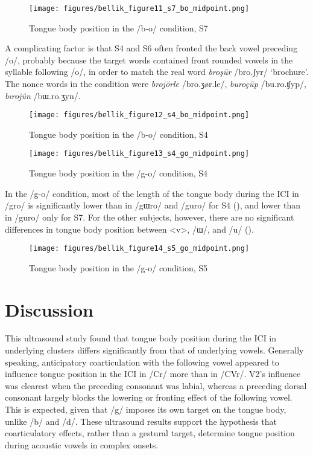 \documentclass[output=paper,colorlinks,citecolor=brown]{langscibook}
\begin{document}
\begin{figure}
\caption{Tongue body position in the /b-o/ condition, S7}
\texttt{[image: figures/bellik\_figure11\_s7\_bo\_midpoint.png]}
\label{bos7}
\end{figure}

A complicating factor is that S4 and S6 often fronted the back vowel preceding /o/, probably because the target words contained front rounded vowels in the syllable following /o/, in order to match the real word \textit{broşür} /bro.ʃyr/ ‘brochure’. The nonce words in the condition were \textit{brojörle} /bro.ʒør.le/, \textit{buroçüp} /bu.ro.ʧyp/, \textit{bırojün} /bɯ.ro.ʒyn/.

\begin{figure}
\caption{Tongue body position in the /b-o/ condition, S4}
\texttt{[image: figures/bellik\_figure12\_s4\_bo\_midpoint.png]}
\label{bos4}
\end{figure}

\begin{figure}
\caption{Tongue body position in the /g-o/ condition, S4}
\texttt{[image: figures/bellik\_figure13\_s4\_go\_midpoint.png]}
\label{gos4}
\end{figure}


In the /g-o/ condition, most of the length of the tongue body during the ICI in /gro/ is significantly lower than in /gɯro/ and /guro/ for S4 (), and lower than in /guro/ only for S7. For the other subjects, however, there are no significant differences in tongue body position between <v>, /ɯ/, and /u/ ().

\begin{figure}
\caption{Tongue body position in the /g-o/ condition, S5}
\texttt{[image: figures/bellik\_figure14\_s5\_go\_midpoint.png]}
\label{gos5}
\end{figure}


\section{Discussion}
This ultrasound study found that tongue body position during the ICI in underlying clusters differs significantly from that of underlying vowels. Generally speaking, anticipatory coarticulation with the following vowel appeared to influence tongue position in the ICI in /Cr/ more than in /CVr/. V2's influence was clearest when the preceding consonant was labial, whereas a preceding dorsal consonant largely blocks the lowering or fronting effect of the following vowel. This is expected, given that /g/ imposes its own target on the tongue body, unlike /b/ and /d/. These ultrasound results support the hypothesis that coarticulatory effects, rather than a gestural target, determine tongue position during acoustic vowels in complex onsets.
\end{document}

